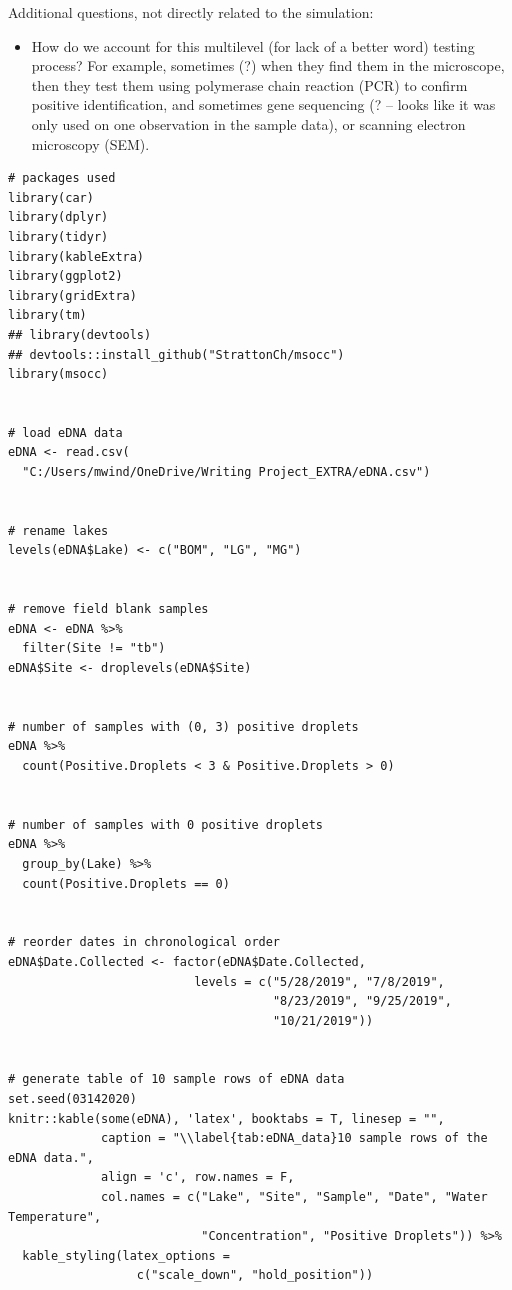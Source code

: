 \documentclass[12pt]{article}\usepackage[]{graphicx}\usepackage[]{color}
\makeatletter
\newenvironment{kframe}{%
 \def\at@end@of@kframe{}%
 \ifinner\ifhmode%
  \def\at@end@of@kframe{\end{minipage}}%
  \begin{minipage}{\columnwidth}%
 \fi\fi%
 \def\FrameCommand##1{\hskip\@totalleftmargin \hskip-\fboxsep
 \colorbox{shadecolor}{##1}\hskip-\fboxsep
     \hskip-\linewidth \hskip-\@totalleftmargin \hskip\columnwidth}%
 \MakeFramed {\advance\hsize-\width
   \@totalleftmargin\z@ \linewidth\hsize
   \@setminipage}}%
 {\par\unskip\endMakeFramed%
 \at@end@of@kframe}
\newenvironment{knitrout}{}{} %
\newenvironment{kframe}{%
 \def\at@end@of@kframe{}%
 \ifinner\ifhmode%
  \def\at@end@of@kframe{\end{minipage}}%
  \begin{minipage}{\columnwidth}%
 \fi\fi%
 \def\FrameCommand##1{\hskip\@totalleftmargin \hskip-\fboxsep
 \colorbox{shadecolor}{##1}\hskip-\fboxsep
     \hskip-\linewidth \hskip-\@totalleftmargin \hskip\columnwidth}%
 \MakeFramed {\advance\hsize-\width
   \@totalleftmargin\z@ \linewidth\hsize
   \@setminipage}}%
 {\par\unskip\endMakeFramed%
 \at@end@of@kframe}
\newenvironment{knitrout}{}{} %
\makeatother
\begin{document}
Additional questions, not directly related to the simulation:
\begin{itemize}
	\item How do we account for this multilevel (for lack of a better word) testing process? For example, sometimes (?) when they find them in the microscope, then they test them using polymerase chain reaction (PCR) to confirm positive identification, and sometimes gene sequencing (? -- looks like it was only used on one observation in the sample data), or scanning electron microscopy (SEM).
\end{itemize}

\singlespacing

\begin{knitrout}
\color{fgcolor}\begin{kframe}
\begin{verbatim}
# packages used 
library(car)
library(dplyr)
library(tidyr)
library(kableExtra)
library(ggplot2)
library(gridExtra)
library(tm)
## library(devtools)
## devtools::install_github("StrattonCh/msocc")
library(msocc)


# load eDNA data
eDNA <- read.csv(
  "C:/Users/mwind/OneDrive/Writing Project_EXTRA/eDNA.csv")


# rename lakes
levels(eDNA$Lake) <- c("BOM", "LG", "MG")


# remove field blank samples
eDNA <- eDNA %>% 
  filter(Site != "tb")
eDNA$Site <- droplevels(eDNA$Site)


# number of samples with (0, 3) positive droplets
eDNA %>% 
  count(Positive.Droplets < 3 & Positive.Droplets > 0)


# number of samples with 0 positive droplets
eDNA %>% 
  group_by(Lake) %>%
  count(Positive.Droplets == 0)


# reorder dates in chronological order
eDNA$Date.Collected <- factor(eDNA$Date.Collected,
                          levels = c("5/28/2019", "7/8/2019", 
                                     "8/23/2019", "9/25/2019",
                                     "10/21/2019"))


# generate table of 10 sample rows of eDNA data
set.seed(03142020)
knitr::kable(some(eDNA), 'latex', booktabs = T, linesep = "",
             caption = "\\label{tab:eDNA_data}10 sample rows of the eDNA data.", 
             align = 'c', row.names = F, 
             col.names = c("Lake", "Site", "Sample", "Date", "Water Temperature", 
                           "Concentration", "Positive Droplets")) %>%
  kable_styling(latex_options = 
                  c("scale_down", "hold_position"))



\end{verbatim}
\end{kframe}
\end{knitrout}
\end{document}
